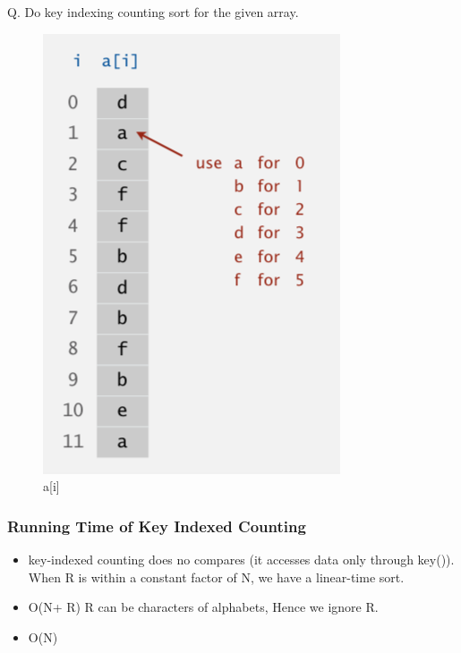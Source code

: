\documentclass[11pt]{beamer}
\begin{document}
\begin{frame}
	Q. Do key indexing counting sort for the given array. 
	\begin{figure}
		\centering
		\includegraphics[width=0.4\linewidth]{"Screenshot 2020-10-14 at 10.10.56 AM"}
		\caption{a[i]}
		\label{fig:screenshot-2020-10-14-at-10}
	\end{figure}
	
\end{frame}

\begin{frame}[fragile]
	\frametitle{Running Time of Key Indexed Counting }
	\begin{itemize}
		\item key-indexed counting does no compares (it accesses data only through key()). When R is within a constant factor of N, we have a linear-time sort.
		\item O(N+ R)
		R can be characters of alphabets, Hence we ignore R.
		\item O(N)
	\end{itemize}
\end{frame}
\end{document}
